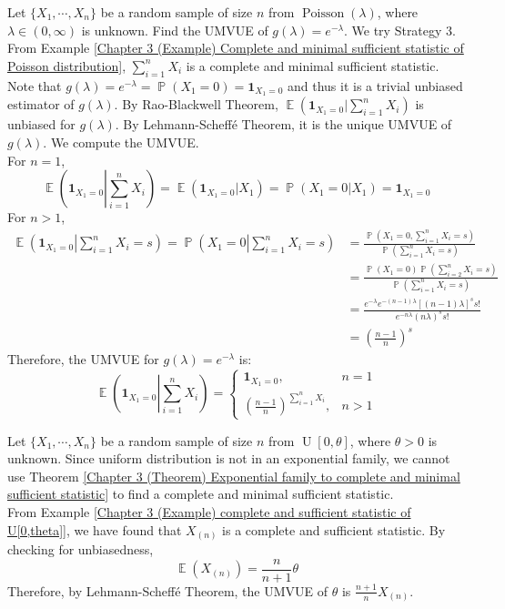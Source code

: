 \documentclass{huhtakm-template-book-v2}
\DeclareMathOperator{\prob}{\mathbb{P}}
\DeclareMathOperator{\E}{\mathbb{E}}
\DeclareMathOperator{\Poisson}{Poisson}
\DeclareMathOperator{\U}{U}
\begin{document}
\newpage
\begin{eg}
	Let $\{X_{1},\cdots,X_{n}\}$ be a random sample of size $n$ from $\Poisson(\lambda)$, where $\lambda\in(0,\infty)$ is unknown. Find the UMVUE of $g(\lambda)=e^{-\lambda}$. We try Strategy 3.\\
	From Example \ref{Chapter 3 (Example) Complete and minimal sufficient statistic of Poisson distribution}, $\sum_{i=1}^{n}X_{i}$ is a complete and minimal sufficient statistic. Note that $g(\lambda)=e^{-\lambda}=\prob(X_{1}=0)=\mathbf{1}_{X_{1}=0}$ and thus it is a trivial unbiased estimator of $g(\lambda)$. By Rao-Blackwell Theorem, $\E(\mathbf{1}_{X_{1}=0}|\sum_{i=1}^{n}X_{i})$ is unbiased for $g(\lambda)$. By Lehmann-Scheff\'e Theorem, it is the unique UMVUE of $g(\lambda)$. We compute the UMVUE.\\
	For $n=1$,
	\begin{equation*}
		\E\left(\mathbf{1}_{X_{1}=0}\left|\sum_{i=1}^{n}X_{i}\right.\right)=\E(\mathbf{1}_{X_{1}=0}|X_{1})=\prob(X_{1}=0|X_{1})=\mathbf{1}_{X_{1}=0}
	\end{equation*}
	For $n>1$,
	\begin{align*}
		\E\left(\mathbf{1}_{X_{1}=0}\left|\sum_{i=1}^{n}X_{i}=s\right.\right)=\prob\left(X_{1}=0\left|\sum_{i=1}^{n}X_{i}=s\right.\right)&=\frac{\prob(X_{1}=0,\sum_{i=1}^{n}X_{i}=s)}{\prob(\sum_{i=1}^{n}X_{i}=s)}\\
		&=\frac{\prob(X_{1}=0)\prob(\sum_{i=2}^{n}X_{i}=s)}{\prob(\sum_{i=1}^{n}X_{i}=s)}\\
		&=\frac{e^{-\lambda}e^{-(n-1)\lambda}[(n-1)\lambda]^{s}s!}{e^{-n\lambda}(n\lambda)^{s}s!}\\
		&=\left(\frac{n-1}{n}\right)^{s}
	\end{align*}
	Therefore, the UMVUE for $g(\lambda)=e^{-\lambda}$ is:
	\begin{equation*}
		\E\left(\mathbf{1}_{X_{1}=0}\left|\sum_{i=1}^{n}X_{i}\right.\right)=\begin{cases}
			\mathbf{1}_{X_{1}=0}, &n=1\\
			\left(\frac{n-1}{n}\right)^{\sum_{i=1}^{n}X_{i}}, &n>1
		\end{cases}
	\end{equation*}
\end{eg}
\begin{eg}
	Let $\{X_{1},\cdots,X_{n}\}$ be a random sample of size $n$ from $\U[0,\theta]$, where $\theta>0$ is unknown. Since uniform distribution is not in an exponential family, we cannot use Theorem \ref{Chapter 3 (Theorem) Exponential family to complete and minimal sufficient statistic} to find a complete and minimal sufficient statistic.\\
	From Example \ref{Chapter 3 (Example) complete and sufficient statistic of U[0,theta]}, we have found that $X_{(n)}$ is a complete and sufficient statistic. By checking for unbiasedness,
	\begin{equation*}
		\E(X_{(n)})=\frac{n}{n+1}\theta
	\end{equation*}
	Therefore, by Lehmann-Scheff\'e Theorem, the UMVUE of $\theta$ is $\frac{n+1}{n}X_{(n)}$.
\end{eg}
\end{document}
